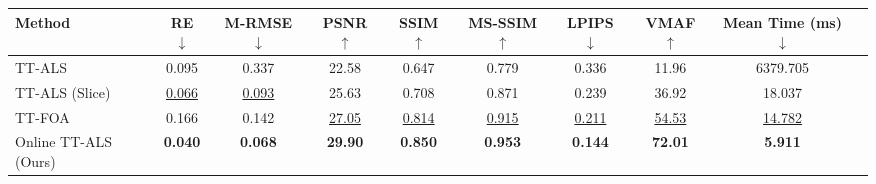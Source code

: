 \documentclass[a4paper, 11pt]{article}
\theoremstyle{plain}
\theoremstyle{definition}
\theoremstyle{remark}
\begin{document}
\begin{table}[t]
\begin{minipage}[t]{0.48\linewidth}
{\begin{tabular}{l cc c cc c cc c}
        \textbf{Method} & RE $\downarrow$ & M-RMSE $\downarrow$ & PSNR $\uparrow$ & SSIM $\uparrow$ & MS-SSIM $\uparrow$ & LPIPS $\downarrow$ & VMAF $\uparrow$ & \makecell{Mean Time \\ (ms) $\downarrow$} \\
        \midrule
        TT-ALS                & 0.095 & 0.337 & 22.58 & 0.647 & 0.779 & 0.336 & 11.96 & 6379.705 \\
        TT-ALS (Slice)        & \underline{0.066} & \underline{0.093} & 25.63 & 0.708 & 0.871 & 0.239 & 36.92 & 18.037 \\
        TT-FOA                & 0.166 & 0.142 & \underline{27.05} & \underline{0.814} & \underline{0.915} & \underline{0.211} & \underline{54.53} & \underline{14.782} \\
        Online TT-ALS (Ours) & \textbf{0.040} & \textbf{0.068} & \textbf{29.90} & \textbf{0.850} & \textbf{0.953} & \textbf{0.144} & \textbf{72.01} & \textbf{5.911} \\
        \bottomrule
        \end{tabular}
        }
    \end{minipage}
\end{table}

\begin{table}[t]
\centering
\caption{Quantitative comparison of algorithms on the dynamic background video ($r=(30,3,3)$).}
\label{tab:comparison_dynamic_background}
\end{table}
\end{document}
